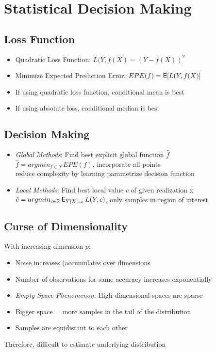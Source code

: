 \documentclass[english]{latex4ei/latex4ei_sheet}
\begin{document}
\section{Statistical Decision Making}
\begin{sectionbox}
\subsection{Loss Function}
\begin{itemize}
    \item Quadratic Loss Function: $L(Y, f(X)=(Y-f(X))^2$
    \item Minimize Expected Prediction Error: $EPE(f) = \operatorname{\textsf{E}}[L(Y,f(X)]$
    \item If using quadratic loss function, conditional mean is best
    \item If using absolute loss, conditional median is best
\end{itemize}

\subsection{Decision Making}
\begin{itemize}
    \item \emph{Global Methods}: Find best explicit global function $\hat{f}$\\
    $\hat{f}=argmin_{f\in\mathcal{F}} EPE(f)$, incorporate all points\\reduce complexity by learning parametrize decision function
    \item \emph{Local Methods}: Find best local value $\hat{c}$ of given realization x\\
    $\hat{c}=argmin_{c\in\operatorname{\mathbb R}}\operatorname{\textsf{E}}_{Y|X=x}L(Y,c)$, only samples in region of interest
\end{itemize}

\subsection{Curse of Dimensionality}
With increasing dimension $p$:
\begin{itemize}
    \item Noise increases (accumulates over dimensions
    \item Number of observations for same accuracy increases exponentially
    \item \emph{Empty Space Phenomenon}: High dimensional spaces are sparse
    \item Bigger space = more samples in the tail of the distribution
    \item Samples are equidistant to each other
\end{itemize}
Therefore, difficult to estimate underlying distribution


\end{sectionbox}
\end{document}

